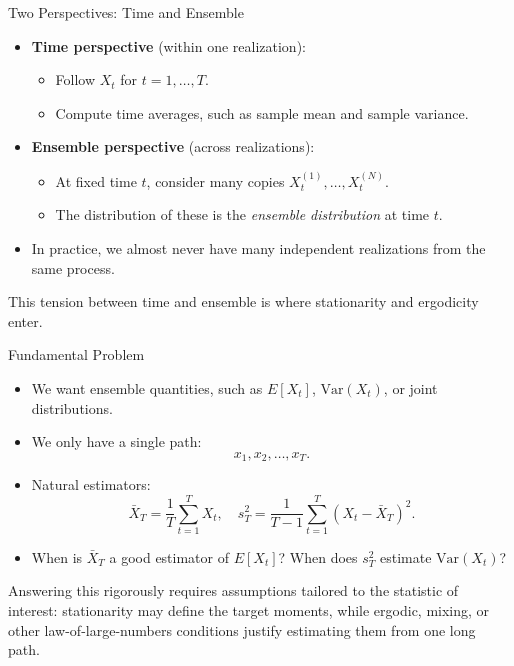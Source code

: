 \documentclass{beamer}
\begin{document}
\begin{frame}{Two Perspectives: Time and Ensemble}
  \begin{itemize}
    \item \textbf{Time perspective} (within one realization):
      \begin{itemize}
        \item Follow $X_t$ for $t=1,\dots,T$.
        \item Compute time averages, such as sample mean and sample variance.
      \end{itemize}
    \item \textbf{Ensemble perspective} (across realizations):
      \begin{itemize}
        \item At fixed time $t$, consider many copies $X_t^{(1)}, \dots, X_t^{(N)}$.
        \item The distribution of these is the \emph{ensemble distribution} at time $t$.
      \end{itemize}
    \item In practice, we almost never have many independent realizations from the same process.
  \end{itemize}

  \vspace{0.3cm}
  This tension between time and ensemble is where stationarity and ergodicity enter.
\end{frame}

\begin{frame}{Fundamental Problem}
  \begin{itemize}
    \item We want ensemble quantities, such as $E[X_t]$, $\mathrm{Var}(X_t)$, or joint distributions.
    \item We only have a single path:
      \[
        x_1, x_2, \dots, x_T.
      \]
    \item Natural estimators:
      \[
        \bar{X}_T = \frac{1}{T} \sum_{t=1}^T X_t,
        \quad
        s_T^2 = \frac{1}{T-1} \sum_{t=1}^T (X_t - \bar{X}_T)^2.
      \]
    \item When is $\bar{X}_T$ a good estimator of $E[X_t]$?  
          When does $s_T^2$ estimate $\mathrm{Var}(X_t)$?
  \end{itemize}

  \vspace{0.2cm}
  Answering this rigorously requires assumptions tailored to the statistic of interest: stationarity may define the target moments, while ergodic, mixing, or other law-of-large-numbers conditions justify estimating them from one long path.
\end{frame}
\end{document}
